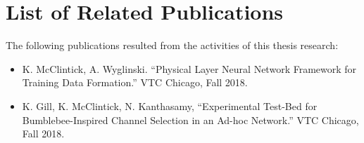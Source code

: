 \section{List of Related Publications}
The following publications resulted from the activities of this thesis research:
\begin{itemize}
	\item K. McClintick, A. Wyglinski. “Physical Layer Neural Network Framework for Training Data Formation.” VTC Chicago, Fall 2018.
	\item K. Gill, K. McClintick, N. Kanthasamy, “Experimental Test-Bed for Bumblebee-Inspired Channel Selection in an Ad-hoc Network.” VTC Chicago, Fall 2018.
\end{itemize}
